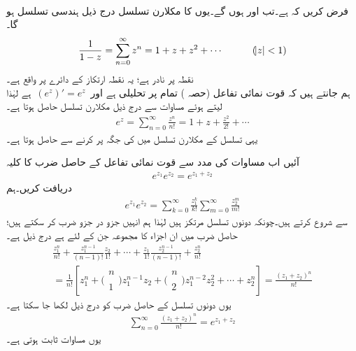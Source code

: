 %
\quad {}\\
فرض کریں کہ  ہے۔تب  اور  ہوں گے۔یوں  کا مکلارن تسلسل درج ذیل ہندسی تسلسل ہو گا۔
\begin{align}
\frac{1}{1-z}=\sum\limits_{n=0}^{\infty} z^n=1+z+z^2+\cdots \quad \quad \quad (\abs{z}<1)
\end{align}
 نقطہ  پر نادر ہے؛ یہ نقطہ ارتکاز کے دائرے پر واقع ہے۔
\quad {}\\
ہم جانتے ہیں کہ قوت نمائی تفاعل  (حصہ ) تمام  پر تحلیلی ہے اور 
$\,(e^z)'=e^z\,$
ہے لہٰذا  لیتے ہوئے مساوات  سے درج ذیل مکلارن تسلسل حاصل ہوتا ہے۔
\begin{align}\label{مساوات_ٹیلر_قوت_نمائی_مکلارن_تسلسل}
e^z=\sum\limits_{n=0}^{\infty} \frac{z^n}{n!}=1+z+\frac{z^2}{2!}+\cdots
\end{align}
یہی تسلسل  کے مکلارن تسلسل میں  کی جگہ  پر کرنے سے حاصل ہوتا ہے۔

آئیں اب مساوات  کی مدد سے قوت نمائی تفاعل کے حاصل ضرب کا کلیہ
\begin{align}\label{مساوات_ٹیلر_قوت_نمائی_حاصل_ضرب}
e^{z_1}e^{z_2}=e^{z_1+z_2}
\end{align}
دریافت کریں۔ہم
\begin{align*}
e^{z_1}e^{z_2}=\sum\limits_{k=0}^{\infty} \frac{z_1^k}{k!}\sum\limits_{m=0}^{\infty}\frac{z_2^m}{m!}
\end{align*}
سے شروع کرتے ہیں۔چونکہ دونوں تسلسل مرتکز ہیں لہٰذا ہم انہیں جزو در جزو ضرب کر سکتے ہیں؛حاصل ضرب میں ان  اجزاء کا مجموعہ جن کے لئے  ہے درج ذیل ہے۔
\begin{multline*}
\frac{z_1^n}{n!}+\frac{z_1^{n-1}}{(n-1)!}\frac{z_2}{1!}+\cdots+\frac{z_1}{1!}\frac{z_2^{n-1}}{(n-1)!}+\frac{z_2^n}{n!}\\
=\frac{1}{n!}[z_1^n+\big(\begin{smallmatrix} n\\  \\1 \end{smallmatrix}\big)z_1^{n-1}z_2+\big(\begin{smallmatrix}n\\  \\2  \end{smallmatrix}\big)z_1^{n-2}z_2^2+\cdots+z_2^n]=\frac{(z_1+z_2)^n}{n!}
\end{multline*}
یوں دونوں تسلسل کے حاصل ضرب کو درج ذیل لکھا جا سکتا ہے۔
\begin{align*}
\sum\limits_{n=0}^{\infty}\frac{(z_1+z_2)^n}{n!}=e^{z_1+z_2}
\end{align*}
یوں مساوات  ثابت ہوتی ہے۔

